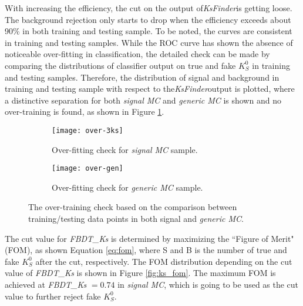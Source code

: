 With increasing the efficiency, the cut on the output of\textit{KsFinder}is getting loose. The background rejection only starts to drop when the efficiency exceeds about 90\% in both training and testing sample. To be noted, the curves are consistent in training and testing samples. 
While the ROC curve has shown the absence of noticeable over-fitting in classification, the detailed check can be made by comparing the distributions of classifier output on true and fake $K_S^0$ in training and testing samples. Therefore, the distribution of signal and background in training and testing sample with respect to the\textit{KsFinder}output is plotted, where a distinctive separation for both \textit{signal MC} and \textit{generic MC} is shown and no over-training is found, as shown in Figure \ref{fig:ks_overtraining}.
\begin{figure}[H]
	\begin{subfigure}{1\linewidth}
		\centering
		\texttt{[image: over-3ks]}
		\caption{Over-fitting check for \textit{signal MC} sample.}
	\end{subfigure}
  	\vspace{0.3cm}

	\begin{subfigure}{1\linewidth}
		\centering
		\texttt{[image: over-gen]}
		\caption{Over-fitting check for \textit{generic MC} sample.}
	\end{subfigure}
\caption{The over-training check based on the comparison between training/testing data points in both signal and \textit{generic MC}.}
\label{fig:ks_overtraining}
	\vspace{0.3cm}
	
\end{figure}

The cut value for \textit{FBDT\_Ks} is determined by maximizing the ``Figure of Merit" (FOM), as shown Equation \ref{eq:fom}, where S and B is the number of true and fake $K_S^0$ after the cut, respectively. The FOM distribution depending on the cut value of \textit{FBDT\_Ks} is shown in Figure \ref{fig:ks_fom}. The maximum FOM is achieved at \textit{FBDT\_Ks} $= 0.74$ in \textit{signal MC}, which is going to be used as the cut value to further reject fake $K_S^0$.

